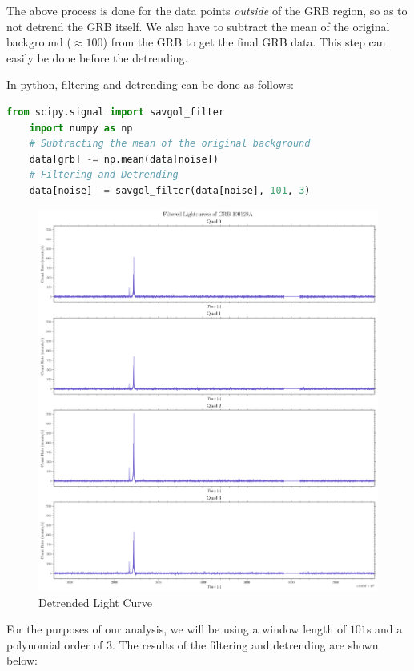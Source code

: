 \documentclass[11pt]{book} %
\begin{document}
The above process is done for the data points \textit{outside} of the GRB region, so as to not detrend the GRB itself. We also have to subtract the mean of the original background ($\approx 100$) from the GRB to get the final GRB data. This step can easily be done before the detrending.

In python, filtering and detrending can be done as follows:

\begin{lstlisting}[language=Python]
    from scipy.signal import savgol_filter
    import numpy as np
    # Subtracting the mean of the original background
    data[grb] -= np.mean(data[noise])
    # Filtering and Detrending
    data[noise] -= savgol_filter(data[noise], 101, 3)
\end{lstlisting}

\begin{figure}
    \centering
    \includegraphics[scale=0.25]{Pictures/detrended.png}
    \caption{Detrended Light Curve}
\end{figure}


For the purposes of our analysis, we will be using a window length of $101$s and a polynomial order of $3$. The results of the filtering and detrending are shown below:
\end{document}
